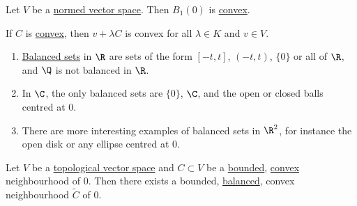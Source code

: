 \documentclass{article}
\begin{document}
\begin{fact}
    Let $V$ be a \hyperlink{def:nvs}{normed vector space}. Then $B_1(0)$ is \hyperlink{def:convexSubs}{convex}.
\end{fact}

\begin{fact}
    If $C$ is \hyperlink{def:convexSubs}{convex}, then $v + \lambda C$ is convex for all $\lambda \in K$ and $v \in V$.
\end{fact}




\begin{eg}
    \leavevmode
    \begin{enumerate}[label=(\roman*)]
        \item \hyperlink{def:balancedSubs}{Balanced sets} in $\R$ are sets of the form $[-t, t]$, $(-t, t)$, $\{0\}$ or all of $\R$, and $\Q$ is not balanced in $\R$.
        \item In $\C$, the only balanced sets are $\{0\}$, $\C$, and the open or closed balls centred at $0$.
        \item There are more interesting examples of balanced sets in $\R^2$, for instance the open disk or any ellipse centred at $0$.
    \end{enumerate}
\end{eg}

\begin{lemma}
    Let $V$ be a \hyperlink{def:tVS}{topological vector space} and $C \subset V$ be a \hyperlink{def:boundedSubs}{bounded}, \hyperlink{def:convexSubs}{convex} neighbourhood of $0$.
    Then there exists a bounded, \hyperlink{def:balancedSubs}{balanced}, {convex} neighbourhood $\widetilde C$ of $0$.
\end{lemma}
\end{document}
